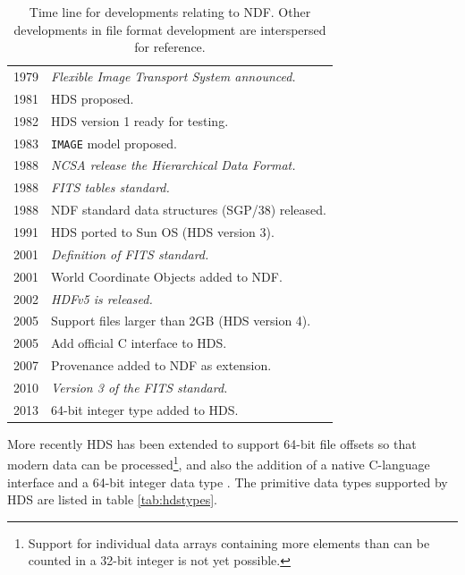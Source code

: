 \documentclass[final,authoryear,5p,times,twocolumn]{elsarticle}
\begin{document}
\begin{table}
\caption{Time line for developments relating to NDF. Other
  developments in file format development are interspersed
  for reference.}
\label{tab:timeline}
\begin{tabular}{|l|l|}
\hline
1979 & \emph{Flexible Image Transport System announced.}\\
1981 & HDS proposed. \\
1982 & HDS version 1 ready for testing. \\
1983 & \texttt{IMAGE} model proposed. \\
1988 & \emph{NCSA release the Hierarchical Data Format.}\\
1988 & \emph{FITS tables standard.}\\
1988 & NDF  standard data structures (SGP/38) released.\\
1991 & HDS ported to Sun OS (HDS version 3).\\
2001 & \emph{Definition of FITS standard.}\\
2001 & World Coordinate Objects added to NDF.\\
2002 & \emph{HDFv5 is released.}\\
2005 & Support files larger than 2GB (HDS version 4).\\
2005 & Add official C interface to HDS.\\
2007 & Provenance added to NDF as extension.\\
2010 & \emph{Version 3 of the FITS standard.}\\
2013 & 64-bit integer type added to HDS.\\
\hline
\end{tabular}
\begin{center}
\end{center}
\end{table}

More recently HDS has been extended to support 64-bit file
offsets so that modern data can be processed\footnote{Support for
  individual data  arrays containing more elements than can be counted
  in a 32-bit integer is not yet possible.}, and also the addition of
a native C-language interface and a 64-bit integer data type
\citep{P82_adassxxiii}. The primitive data types supported by HDS are
listed in table \ref{tab:hdstypes}.
\end{document}
